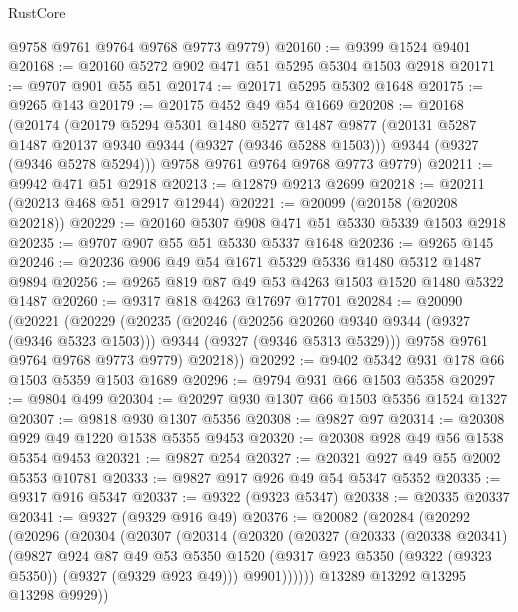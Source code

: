 \begin{lexlean}{RustCore}
\begin{coremodule}
      @9758
      @9761
      @9764
      @9768
      @9773
      @9779)
@20160 := @9399 @1524 @9401
@20168 := @20160 @5272 @902 @471 @51 @5295 @5304 @1503 @2918
@20171 := @9707 @901 @55 @51
@20174 := @20171 @5295 @5302 @1648
@20175 := @9265 @143
@20179 := @20175 @452 @49 @54 @1669
@20208 := @20168
    (@20174
      (@20179
        @5294
        @5301
        @1480
        @5277
        @1487
        @9877
        (@20131 @5287 @1487 @20137 @9340 @9344 (@9327 (@9346 @5288 @1503)))
        @9344
        (@9327 (@9346 @5278 @5294)))
      @9758
      @9761
      @9764
      @9768
      @9773
      @9779)
@20211 := @9942 @471 @51 @2918
@20213 := @12879 @9213 @2699
@20218 := @20211 (@20213 @468 @51 @2917 @12944)
@20221 := @20099 (@20158 (@20208 @20218))
@20229 := @20160 @5307 @908 @471 @51 @5330 @5339 @1503 @2918
@20235 := @9707 @907 @55 @51 @5330 @5337 @1648
@20236 := @9265 @145
@20246 := @20236 @906 @49 @54 @1671 @5329 @5336 @1480 @5312 @1487 @9894
@20256 := @9265 @819 @87 @49 @53 @4263 @1503 @1520 @1480 @5322 @1487
@20260 := @9317 @818 @4263 @17697 @17701
@20284 := @20090
    (@20221
      (@20229
        (@20235
          (@20246
            (@20256 @20260 @9340 @9344 (@9327 (@9346 @5323 @1503)))
            @9344
            (@9327 (@9346 @5313 @5329)))
          @9758
          @9761
          @9764
          @9768
          @9773
          @9779)
        @20218))
@20292 := @9402 @5342 @931 @178 @66 @1503 @5359 @1503 @1689
@20296 := @9794 @931 @66 @1503 @5358
@20297 := @9804 @499
@20304 := @20297 @930 @1307 @66 @1503 @5356 @1524 @1327
@20307 := @9818 @930 @1307 @5356
@20308 := @9827 @97
@20314 := @20308 @929 @49 @1220 @1538 @5355 @9453
@20320 := @20308 @928 @49 @56 @1538 @5354 @9453
@20321 := @9827 @254
@20327 := @20321 @927 @49 @55 @2002 @5353 @10781
@20333 := @9827 @917 @926 @49 @54 @5347 @5352
@20335 := @9317 @916 @5347
@20337 := @9322 (@9323 @5347)
@20338 := @20335 @20337
@20341 := @9327 (@9329 @916 @49)
@20376 := @20082
    (@20284
      (@20292
        (@20296
          (@20304
            (@20307
              (@20314
                (@20320
                  (@20327
                    (@20333
                      (@20338 @20341)
                      (@9827
                        @924
                        @87
                        @49
                        @53
                        @5350
                        @1520
                        (@9317 @923 @5350 (@9322 (@9323 @5350)) (@9327 (@9329 @923 @49)))
                        @9901))))))
            @13289
            @13292
            @13295
            @13298
            @9929))

\end{coremodule}
\end{lexlean}
